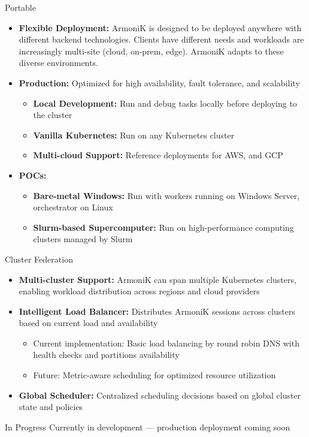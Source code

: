 \begin{frame}{Portable}
	\begin{itemize}
		\item \textbf{Flexible Deployment:} ArmoniK is designed to be deployed anywhere with different backend technologies. Clients have different needs and workloads are increasingly multi-site (cloud, on-prem, edge). ArmoniK adapts to these diverse environments.
		\item \textbf{Production:} Optimized for high availability, fault tolerance, and scalability
		      \begin{itemize}
			      \item \textbf{Local Development:} Run and debug tasks locally before deploying to the cluster
			      \item \textbf{Vanilla Kubernetes:} Run on any Kubernetes cluster
			      \item \textbf{Multi-cloud Support:} Reference deployments for AWS, and GCP
		      \end{itemize}
		\item \textbf{POCs:}
		      \begin{itemize}
			      \item \textbf{Bare-metal Windows:} Run with workers running on Windows Server, orchestrator on Linux
			      \item \textbf{Slurm-based Supercomputer:} Run on high-performance computing clusters managed by Slurm
		      \end{itemize}
	\end{itemize}
\end{frame}

\begin{frame}{Cluster Federation}
	\begin{itemize}
		\item \textbf{Multi-cluster Support:} ArmoniK can span multiple Kubernetes clusters, enabling workload distribution across regions and cloud providers
		\item \textbf{Intelligent Load Balancer:} Distributes ArmoniK sessions across clusters based on current load and availability
		      \begin{itemize}
			      \item Current implementation: Basic load balancing by round robin DNS with health checks and partitions availability
			      \item Future: Metric-aware scheduling for optimized resource utilization
		      \end{itemize}
		\item \textbf{Global Scheduler:} Centralized scheduling decisions based on global cluster state and policies
	\end{itemize}
	\vspace{0.5cm}
	\begin{block}{In Progress}
		Currently in development — production deployment coming soon
	\end{block}
\end{frame}

